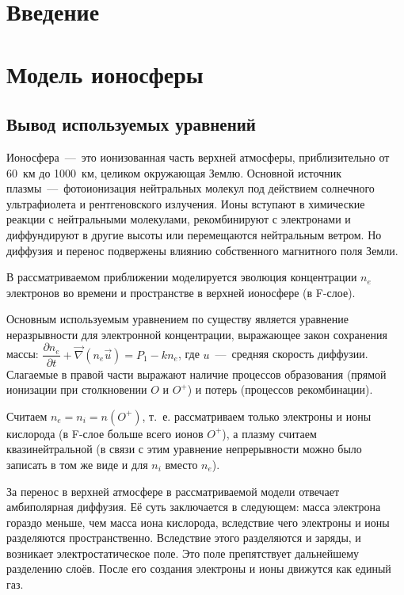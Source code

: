 \documentclass[14pt, a4paper, fleqn]{extarticle}
\begin{document}
\tableofcontents
\clearpage

\section{Введение}

\section{Модель ионосферы}

\subsection{Вывод используемых уравнений}

Ионосфера~---~это ионизованная часть верхней атмосферы, приблизительно от 60~км до 1000~км, целиком окружающая Землю. Основной источник плазмы~---~фотоионизация нейтральных молекул под действием солнечного ультрафиолета и рентгеновского излучения. Ионы вступают в химические реакции с нейтральными молекулами, рекомбинируют с электронами и диффундируют в другие высоты или перемещаются нейтральным ветром. Но диффузия и перенос подвержены влиянию собственного магнитного поля Земли.

\medskip

В рассматриваемом приближении моделируется эволюция концентрации $n_e$ электронов во времени и пространстве в верхней ионосфере (в F-слое).

\medskip

Основным используемым уравнением по существу является уравнение неразрывности для электронной концентрации, выражающее закон сохранения массы: $\dfrac{\partial n_e}{\partial t}+\vec{\nabla}(n_e \vec{u})=P_1-kn_e$, где $u$~---~средняя скорость диффузии. Слагаемые в правой части выражают наличие процессов образования (прямой ионизации при столкновении $O$ и $O^+$) и потерь (процессов рекомбинации).

Считаем $n_e=n_i = n(O^+)$, т.~е. рассматриваем только электроны и ионы кислорода (в F-слое больше всего ионов $O^+$), а плазму считаем квазинейтральной (в связи с этим уравнение непрерывности можно было записать в том же виде и для $n_i$ вместо $n_e$).

\medskip

За перенос в верхней атмосфере в рассматриваемой модели отвечает амбиполярная диффузия. Её суть заключается в следующем: масса электрона гораздо меньше, чем масса иона кислорода, вследствие чего электроны и ионы разделяются пространственно. Вследствие этого разделяются и заряды, и возникает электростатическое поле. Это поле препятствует дальнейшему разделению слоёв. После его создания электроны и ионы движутся как единый газ.
\end{document}
